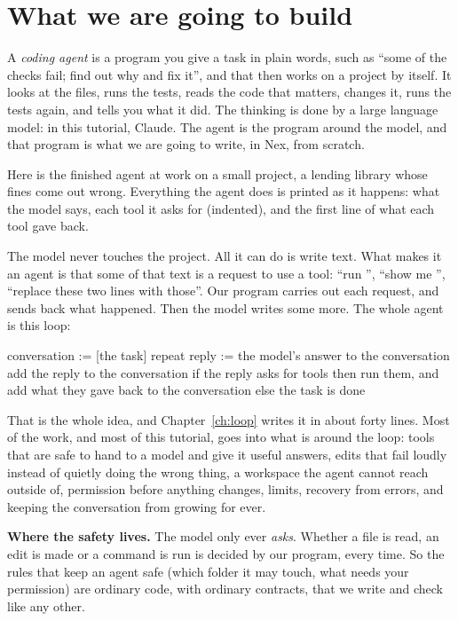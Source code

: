 \chapter{What we are going to build}

A \emph{coding agent} is a program you give a task in plain words, such as
``some of the checks fail; find out why and fix it'', and that then works
on a project by itself. It looks at the files, runs the tests, reads the
code that matters, changes it, runs the tests again, and tells you what it
did. The thinking is done by a large language model: in this tutorial,
Claude. The agent is the program around the model, and that program is
what we are going to write, in Nex, from scratch.

Here is the finished agent at work on a small project, a lending library
whose fines come out wrong. Everything the agent does is printed as it
happens: what the model says, each tool it asks for (indented), and the
first line of what each tool gave back.


The model never touches the project. All it can do is write text. What
makes it an agent is that some of that text is a request to use a tool:
``run '', ``show me '', ``replace
these two lines with those''. Our program carries out each request, and
sends back what happened. Then the model writes some more. The whole agent
is this loop:

\begin{shell}
conversation := [the task]
repeat
    reply := the model's answer to the conversation
    add the reply to the conversation
    if the reply asks for tools then
        run them, and add what they gave back to the conversation
    else
        the task is done
\end{shell}

That is the whole idea, and Chapter~\ref{ch:loop} writes it in about forty
lines. Most of the work, and most of this tutorial, goes into what is
around the loop: tools that are safe to hand to a model and give it useful
answers, edits that fail loudly instead of quietly doing the wrong thing,
a workspace the agent cannot reach outside of, permission before anything
changes, limits, recovery from errors, and keeping the conversation from
growing for ever.

\begin{aside}
\textbf{Where the safety lives.} The model only ever \emph{asks}. Whether a
file is read, an edit is made or a command is run is decided by our
program, every time. So the rules that keep an agent safe (which folder it
may touch, what needs your permission) are ordinary code, with ordinary
contracts, that we write and check like any other.
\end{aside}

